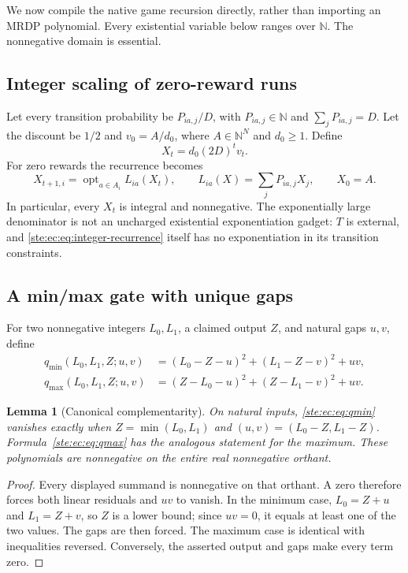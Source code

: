 \documentclass[11pt,letterpaper]{article}
\newtheorem{lemma}[theorem]{Lemma}
\theoremstyle{definition}
\theoremstyle{remark}
\newcommand{\N}{\mathbb N}
\newcommand{\opt}{\operatorname{opt}}
\begin{document}
We now compile the native game recursion directly, rather than importing
an MRDP polynomial. Every existential variable below ranges over $\N$.
The nonnegative domain is essential.

\subsection{Integer scaling of zero-reward runs}

Let every transition probability be $P_{ia,j}/D$, with
$P_{ia,j}\in\N$ and $\sum_jP_{ia,j}=D$. Let the discount be $1/2$ and
$v_0=A/d_0$, where $A\in\N^N$ and $d_0\geq1$. Define
\begin{equation}
 X_t=d_0(2D)^t v_t.
 \label{ste:ec:eq:integer-scale-zero}
\end{equation}
For zero rewards the recurrence becomes
\begin{equation}
 X_{t+1,i}=\opt_{a\in A_i}L_{ia}(X_t),\qquad
 L_{ia}(X)=\sum_jP_{ia,j}X_j,
 \qquad X_0=A.
 \label{ste:ec:eq:integer-recurrence}
\end{equation}
In particular, every $X_t$ is integral and nonnegative. The exponentially
large denominator is not an uncharged existential exponentiation gadget:
$T$ is external, and \eqref{ste:ec:eq:integer-recurrence} itself has no
exponentiation in its transition constraints.

\subsection{A min/max gate with unique gaps}

For two nonnegative integers $L_0,L_1$, a claimed output $Z$, and natural
gaps $u,v$, define
\begin{align}
 q_{\min}(L_0,L_1,Z;u,v)
  &=(L_0-Z-u)^2+(L_1-Z-v)^2+uv,
 \label{ste:ec:eq:qmin}\\
 q_{\max}(L_0,L_1,Z;u,v)
  &=(Z-L_0-u)^2+(Z-L_1-v)^2+uv.
 \label{ste:ec:eq:qmax}
\end{align}

\begin{lemma}[Canonical complementarity]
\label{ste:ec:lem:complementarity}
On natural inputs, \eqref{ste:ec:eq:qmin} vanishes exactly when
$Z=\min(L_0,L_1)$ and $(u,v)=(L_0-Z,L_1-Z)$. Formula~\eqref{ste:ec:eq:qmax}
has the analogous statement for the maximum. These polynomials are
nonnegative on the entire real nonnegative orthant.
\end{lemma}

\begin{proof}
Every displayed summand is nonnegative on that orthant. A zero therefore
forces both linear residuals and $uv$ to vanish. In the minimum case,
$L_0=Z+u$ and $L_1=Z+v$, so $Z$ is a lower bound; since $uv=0$, it equals
at least one of the two values. The gaps are then forced. The maximum
case is identical with inequalities reversed. Conversely, the asserted
output and gaps make every term zero.
\end{proof}
\end{document}
